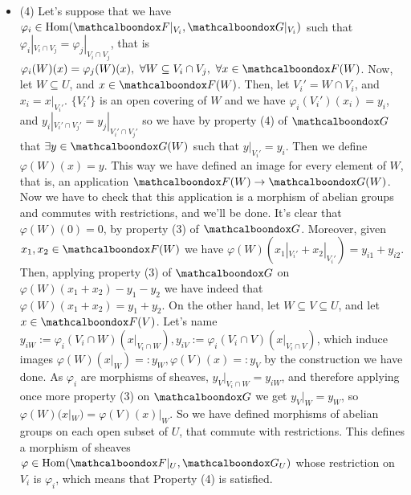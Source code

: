 \begin{sol}
\begin{itemize}
		\item (4) Let's suppose that we have $\varphi_i \in \mathrm{Hom}(\sF|_{V_i}, \sG|_{V_i})$ such that $\varphi_i|_{V_i \cap V_j} = \varphi_j|_{V_i \cap V_j}$, that is $\varphi_i(W)(x) = \varphi_j(W)(x), \, \, \forall W \subseteq V_i \cap V_j, \, \, \forall x \in \sF(W)$. Now, let $W \subseteq U$, and $x \in \sF(W)$. Then, let $V_i' = W \cap V_i$, and $x_i = x|_{V_i'}$. $\{V_i'\}$ is an open covering of $W$ and we have $\varphi_i(V_i')(x_i) = y_i$, and $y_i|_{V_i'\cap V_j'} = y_j|_{V_i' \cap V_j'}$ so we have by property (4) of $\sG$ that $\exists y \in \sG(W)$ such that $y|_{V_i'} = y_i$. Then we define $\varphi(W)(x) = y$. This way we have defined an image for every element of $W$, that is, an application $\sF(W) \to \sG(W)$. Now we have to check that this application is a morphism of abelian groups and commutes with restrictions, and we'll be done. It's clear that $\varphi(W)(0) = 0$, by property (3) of $\sG$. Moreover, given $x_1, x_2 \in \sF(W)$ we have $\varphi(W)(x_1|_{V_i'} + x_2|_{V_i'}) = y_{i1} + y_{i2}$. Then, applying property (3) of $\sG$ on $\varphi(W)(x_1+x_2)-y_1-y_2$ we have indeed that $\varphi(W)(x_1+x_2) = y_1 + y_2$. On the other hand, let $W \subseteq V \subseteq U$, and let $x \in \sF(V)$. Let's name $y_{iW} := \varphi_i(V_i \cap W)(x|_{V_i \cap W}), y_{iV} := \varphi_i(V_i \cap V)(x|_{V_i \cap V})$, which induce images $\varphi(W)(x|_W) =: y_W, \varphi(V)(x) =: y_V$ by the construction we have done. As $\varphi_i$ are morphisms of sheaves, $y_V|_{V_i \cap W} = y_{iW}$, and therefore applying once more property (3) on $\sG$ we get $y_V|_{W} = y_W$, so $\varphi(W)(x|_W) = \varphi(V)(x)|_W$. So we have defined morphisms of abelian groups on each open subset of $U$, that commute with restrictions. This defines a morphism of sheaves $\varphi \in \mathrm{Hom}(\sF|_{U}, \sG_{U})$ whose restriction on $V_i$ is $\varphi_i$, which means that Property (4) is satisfied.
	\end{itemize}
\end{sol}

